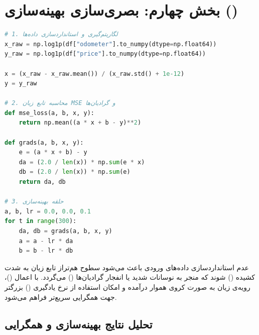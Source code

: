 \clearpage
\section{بخش چهارم: بصری‌سازی بهینه‌سازی ()}

\begin{stepbox}
\end{stepbox}

\begin{codebox}
\begin{lstlisting}[language=Python]
# 1. لگاریتم‌گیری و استانداردسازی داده‌ها
x_raw = np.log1p(df["odometer"].to_numpy(dtype=np.float64))
y_raw = np.log1p(df["price"].to_numpy(dtype=np.float64))

x = (x_raw - x_raw.mean()) / (x_raw.std() + 1e-12)
y = y_raw

# 2. محاسبه تابع زیان MSE و گرادیان‌ها
def mse_loss(a, b, x, y):
    return np.mean((a * x + b - y)**2)

def grads(a, b, x, y):
    e = (a * x + b) - y
    da = (2.0 / len(x)) * np.sum(e * x)
    db = (2.0 / len(x)) * np.sum(e)
    return da, db

# 3. حلقه بهینه‌سازی
a, b, lr = 0.0, 0.0, 0.1
for t in range(300):
    da, db = grads(a, b, x, y)
    a = a - lr * da
    b = b - lr * db
\end{lstlisting}
\end{codebox}

\begin{warnbox}
عدم استانداردسازی داده‌های ورودی باعث می‌شود سطوح هم‌تراز تابع زیان به شدت کشیده () شوند که منجر به نوسانات شدید یا انفجار گرادیان‌ها () می‌گردد. با اعمال ()، رویه‌ی زیان به صورت کروی هموار درآمده و امکان استفاده از نرخ یادگیری () بزرگتر جهت همگرایی سریع‌تر فراهم می‌شود.
\end{warnbox}

\subsection{تحلیل نتایج بهینه‌سازی و همگرایی}

